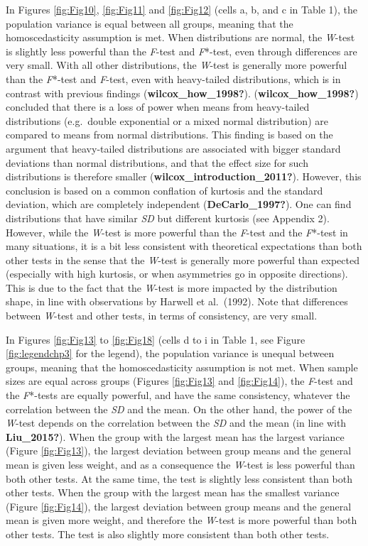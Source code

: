 \documentclass[
  english,
  man]{apa6}
\begin{document}
In Figures \ref{fig:Fig10}, \ref{fig:Fig11} and \ref{fig:Fig12} (cells a, b, and c in Table 1), the population variance is equal between all groups, meaning that the homoscedasticity assumption is met. When distributions are normal, the \emph{W}-test is slightly less powerful than the \emph{F}-test and \emph{F}*-test, even through differences are very small. With all other distributions, the \emph{W}-test is generally more powerful than the \emph{F}*-test and \emph{F}-test, even with heavy-tailed distributions, which is in contrast with previous findings (\textbf{wilcox\_how\_1998?}). (\textbf{wilcox\_how\_1998?}) concluded that there is a loss of power when means from heavy-tailed distributions (e.g.~double exponential or a mixed normal distribution) are compared to means from normal distributions. This finding is based on the argument that heavy-tailed distributions are associated with bigger standard deviations than normal distributions, and that the effect size for such distributions is therefore smaller (\textbf{wilcox\_introduction\_2011?}). However, this conclusion is based on a common conflation of kurtosis and the standard deviation, which are completely independent (\textbf{DeCarlo\_1997?}). One can find distributions that have similar \emph{SD} but different kurtosis (see Appendix 2). However, while the \emph{W}-test is more powerful than the \emph{F}-test and the \emph{F}*-test in many situations, it is a bit less consistent with theoretical expectations than both other tests in the sense that the \emph{W}-test is generally more powerful than expected (especially with high kurtosis, or when asymmetries go in opposite directions). This is due to the fact that the \emph{W}-test is more impacted by the distribution shape, in line with observations by Harwell et al.~(1992). Note that differences between \emph{W}-test and other tests, in terms of consistency, are very small.

In Figures \ref{fig:Fig13} to \ref{fig:Fig18} (cells d to i in Table 1, see Figure \ref{fig:legendchp3} for the legend), the population variance is unequal between groups, meaning that the homoscedasticity assumption is not met. When sample sizes are equal across groups (Figures \ref{fig:Fig13} and \ref{fig:Fig14}), the \emph{F}-test and the \emph{F}*-tests are equally powerful, and have the same consistency, whatever the correlation between the \emph{SD} and the mean. On the other hand, the power of the \emph{W}-test depends on the correlation between the \emph{SD} and the mean (in line with \textbf{Liu\_2015?}). When the group with the largest mean has the largest variance (Figure \ref{fig:Fig13}), the largest deviation between group means and the general mean is given less weight, and as a consequence the \emph{W}-test is less powerful than both other tests. At the same time, the test is slightly less consistent than both other tests. When the group with the largest mean has the smallest variance (Figure \ref{fig:Fig14}), the largest deviation between group means and the general mean is given more weight, and therefore the \emph{W}-test is more powerful than both other tests. The test is also slightly more consistent than both other tests.
\end{document}
